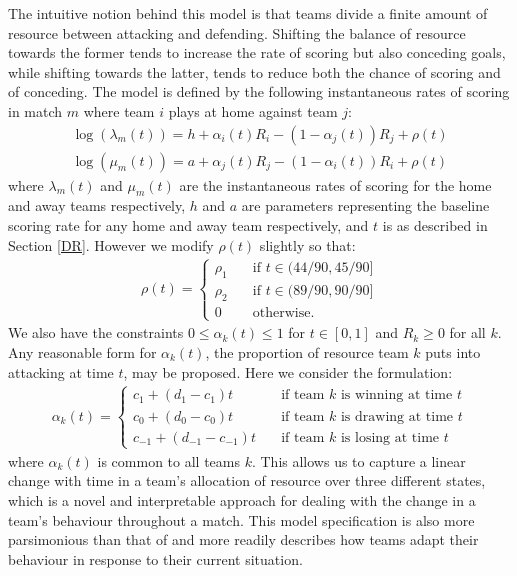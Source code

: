 The intuitive notion behind this model is that teams divide a finite amount of resource between attacking and defending.
Shifting the balance of resource towards the former tends to increase the rate of scoring but also conceding goals,
while shifting towards the latter, tends to reduce both the chance of scoring and of conceding. The model is defined by
the following instantaneous rates of scoring in match \(m\) where team \(i\) plays at home against team \(j\):
\begin{align}
\log(\lambda_m(t)) = h + \alpha_i(t) R_i - (1 - \alpha_j(t)) R_j + \rho(t) \label{homeRate}\\
\log(\mu_m(t)) = a + \alpha_j(t) R_j - (1 - \alpha_i(t)) R_i + \rho(t) \label{awayRate}
\end{align}
where \(\lambda_m(t)\) and \(\mu_m(t)\) are the instantaneous rates of scoring for the home and away teams
respectively, \(h\) and \(a\) are parameters representing the baseline scoring rate for any home and away team
respectively, and \(t\) is as described in Section \ref{DR}. However we modify \(\rho(t)\) slightly so that:
\begin{align}
\rho(t) = \left \{
\begin{array}{ll}
\rho_1 \quad &\text{if \(t \in (44/90, 45/90]\)}\\
\rho_2 \quad &\text{if \(t \in (89/90, 90/90]\)}\\
0      \quad &\text{otherwise.}
\end{array} \right.
\end{align}
We also have the constraints \(0 \leq \alpha_k(t) \leq 1\) for \(t \in [0, 1]\) and \(R_k \geq 0\) for all \(k\). Any
reasonable form for \(\alpha_k(t)\), the proportion of resource team \(k\) puts into attacking at time \(t\), may be
proposed. Here we consider the formulation:
\begin{align}
\alpha_k(t) = \left \{
\begin{array}{ll}
c_{1} + (d_{1} -c_{1})t     \quad &\text{if team \(k\) is winning at time \(t\)}\\
c_{0} + (d_{0} - c_{0})t    \quad &\text{if team \(k\) is drawing at time \(t\)}\\
c_{-1} + (d_{-1} - c_{-1})t \quad &\text{if team \(k\) is losing at time \(t\)}
\end{array} \right.
\end{align}
where \(\alpha_k(t)\) is common to all teams \(k\). This allows us to capture a linear change with time in a team's
allocation of resource over three different states, which is a novel and interpretable approach for dealing with the
change in a team's behaviour throughout a match. This model specification is also more parsimonious than that of
\cite{DixonRobinson1998} and more readily describes how teams adapt their behaviour in response to their current
situation.

